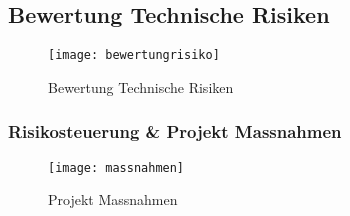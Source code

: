 \subsection{Bewertung Technische Risiken}
\begin{figure}[htb!]
	\begin{center}
		\texttt{[image: bewertungrisiko]}
		\caption[Bewertung Technische Risiken]{Bewertung Technische Risiken}
		\label{fig:techrisiko}
	\end{center}
\end{figure}
\subsubsection{Risikosteuerung \& Projekt Massnahmen}
\begin{figure}[htb!]
	\begin{center}
		\texttt{[image: massnahmen]}
		\caption[Projekt Massnahmen]{Projekt Massnahmen}
		\label{fig:risikomassnahmen}
	\end{center}
\end{figure}

\newpage
